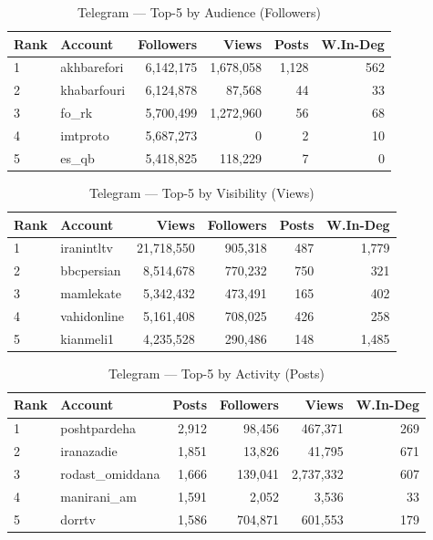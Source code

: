 \documentclass{article}
\begin{document}
	
\begin{table}[h!]
\centering
\begin{tabular}{llrrrr}
	\toprule
	Rank & Account & Followers & Views & Posts & W.In-Deg \\
	\midrule
	1 & akhbarefori   & 6,142,175 & 1,678,058 & 1,128 & 562 \\
	2 & khabarfouri   & 6,124,878 & 87,568    & 44    & 33  \\
	3 & fo\_rk        & 5,700,499 & 1,272,960 & 56    & 68  \\
	4 & imtproto      & 5,687,273 & 0         & 2     & 10  \\
	5 & es\_qb        & 5,418,825 & 118,229   & 7     & 0   \\
	\bottomrule
\end{tabular}
\caption{Telegram — Top-5 by Audience (Followers)}
\end{table}


\begin{table}[h!]
\centering
\begin{tabular}{llrrrr}
	\toprule
	Rank & Account & Views & Followers & Posts & W.In-Deg \\
	\midrule
	1 & iranintltv  & 21,718,550 & 905,318 & 487 & 1,779 \\
	2 & bbcpersian  & 8,514,678  & 770,232 & 750 & 321  \\
	3 & mamlekate   & 5,342,432  & 473,491 & 165 & 402  \\
	4 & vahidonline & 5,161,408  & 708,025 & 426 & 258  \\
	5 & kianmeli1   & 4,235,528  & 290,486 & 148 & 1,485\\
	\bottomrule
\end{tabular}
\caption{Telegram — Top-5 by Visibility (Views)}
\end{table}


\begin{table}[h!]
\centering
\begin{tabular}{llrrrr}
	\toprule
	Rank & Account & Posts & Followers & Views & W.In-Deg \\
	\midrule
	1 & poshtpardeha      & 2,912 & 98,456  & 467,371  & 269 \\
	2 & iranazadie        & 1,851 & 13,826  & 41,795   & 671 \\
	3 & rodast\_omiddana  & 1,666 & 139,041 & 2,737,332& 607 \\
	4 & manirani\_am      & 1,591 & 2,052   & 3,536    & 33  \\
	5 & dorrtv            & 1,586 & 704,871 & 601,553  & 179 \\
	\bottomrule
\end{tabular}
\caption{Telegram — Top-5 by Activity (Posts)}
\end{table}
\end{document}
